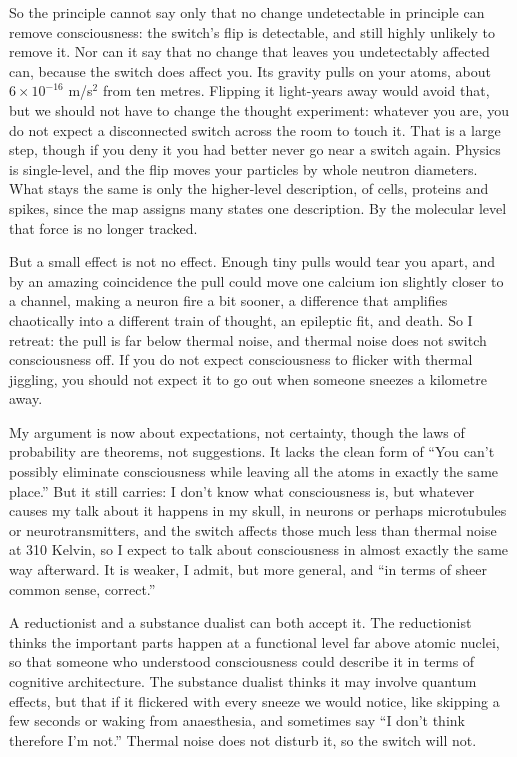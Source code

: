 So the principle cannot say only that no change undetectable in principle can remove consciousness: the switch's flip is detectable, and still highly unlikely to remove it. Nor can it say that no change that leaves you undetectably affected can, because the switch does affect you. Its gravity pulls on your atoms, about $6 \times 10^{-16}$ m/s$^2$ from ten metres.  Flipping it light-years away would avoid that, but we should not have to change the thought experiment: whatever you are, you do not expect a disconnected switch across the room to touch it. That is a large step, though if you deny it you had better never go near a switch again. Physics is single-level, and the flip moves your particles by whole neutron diameters. What stays the same is only the higher-level description, of cells, proteins and spikes, since the map assigns many states one description. By the molecular level that force is no longer tracked.

But a small effect is not no effect. Enough tiny pulls would tear you apart, and by an amazing coincidence the pull could move one calcium ion slightly closer to a channel, making a neuron fire a bit sooner, a difference that amplifies chaotically into a different train of thought, an epileptic fit, and death. So I retreat: the pull is far below thermal noise, and thermal noise does not switch consciousness off. If you do not expect consciousness to flicker with thermal jiggling, you should not expect it to go out when someone sneezes a kilometre away.

My argument is now about expectations, not certainty, though the laws of probability are theorems, not suggestions. It lacks the clean form of ``You can't possibly eliminate consciousness while leaving all the atoms in exactly the same place.'' But it still carries: I don't know what consciousness is, but whatever causes my talk about it happens in my skull, in neurons or perhaps microtubules or neurotransmitters, and the switch affects those much less than thermal noise at 310 Kelvin, so I expect to talk about consciousness in almost exactly the same way afterward. It is weaker, I admit, but more general, and ``in terms of sheer common sense, correct.''

A reductionist and a substance dualist can both accept it. The reductionist thinks the important parts happen at a functional level far above atomic nuclei, so that someone who understood consciousness could describe it in terms of cognitive architecture. The substance dualist thinks it may involve quantum effects, but that if it flickered with every sneeze we would notice, like skipping a few seconds or waking from anaesthesia, and sometimes say ``I don't think therefore I'm not.'' Thermal noise does not disturb it, so the switch will not.

